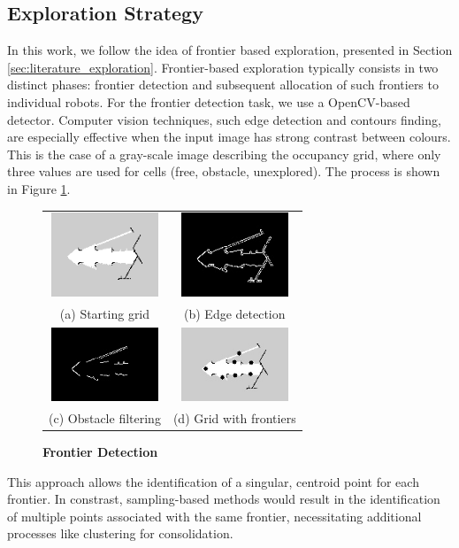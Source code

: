 \subsection{Exploration Strategy}
In this work, we follow the idea of frontier based exploration, presented in Section \ref{sec:literature_exploration}.
Frontier-based exploration typically consists in two distinct phases: frontier detection and subsequent allocation of such frontiers to individual robots.
For the frontier detection task, we use a OpenCV-based detector. Computer vision techniques, such edge detection and contours finding, are especially effective when the input image has strong contrast between colours. This is the case of a gray-scale image describing the occupancy grid, where only three values are used for cells (free, obstacle, unexplored). The process is shown in Figure \ref{fig:cv}.
\begin{figure}[H]
\centering
\begin{tabular}{cc}
  \includegraphics[width=32mm]{img/crop_input.png} &   \includegraphics[width=32mm]{img/crop_edges.png} \\
(a) Starting grid & (b) Edge detection \\[6pt]
 \includegraphics[width=32mm]{img/crop_res.png} &   \includegraphics[width=32mm]{img/crop_points.png} \\
(c) Obstacle filtering & (d) Grid with frontiers \\
\end{tabular}
\caption{\textbf{Frontier Detection}}
\label{fig:cv}
\end{figure}
This approach allows the identification of a singular, centroid point for each frontier. In constrast, sampling-based methods would result in the identification of multiple points associated with the same frontier, necessitating additional processes like clustering for consolidation.

